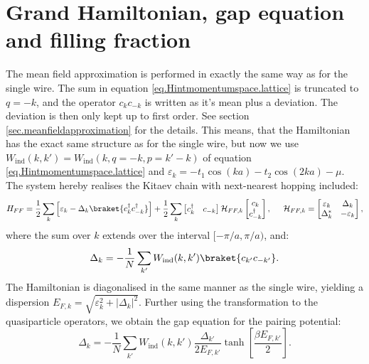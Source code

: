 \section{Grand Hamiltonian, gap equation and filling fraction} \label{sec.grandhamiltonian.lattice}
The mean field approximation is performed in exactly the same way as for the single wire. The sum in equation \eqref{eq.Hintmomentumspace.lattice} is truncated to $q = -k$, and the operator $c_kc_{-k}$ is written as it's mean plus a deviation. The deviation is then only kept up to first order. See section \ref{sec.meanfieldapproximation} for the details. This means, that the Hamiltonian has the exact same structure as for the single wire, but now we use $W_{\text{ind}}(k, k') = W_{\text{ind}}(k, q = -k, p = k' - k)$ of equation \eqref{eq.Hintmomentumspace.lattice} and $\varepsilon_k = - t_1\cos(ka) - t_2\cos(2ka) - \mu$. The system hereby realises the Kitaev chain with next-nearest hopping included: 
\begin{equation}
H_{FF} = \frac{1}{2}\sum_k \left[\varepsilon_k - \Delta_k \braket {c^\dagger_k c^\dagger_{-k}}\right] + \frac{1}{2}\sum_{k} \begin{bmatrix} c_k^\dagger & c_{-k} \end{bmatrix} \mathcal{H}_{FF,k} \begin{bmatrix} c_k \\ c^\dagger_{-k} \end{bmatrix}, \hspace{0.5cm} \mathcal{H}_{FF,k} = \begin{bmatrix} \varepsilon_k & \Delta_k \\ \Delta^*_k & -\varepsilon_k \end{bmatrix}, 
\label{eq.grandhamiltonian.lattice}
\end{equation}
where the sum over $k$ extends over the interval $[-\pi/a, \pi/a )$, and: 
\begin{equation}
\Delta_k = - \frac{1}{N}\sum_{k'} W_{\text{ind}}(k,k')\braket{c_{k'}c_{-k'}}.
\label{eq.pairingpotential.lattice}
\end{equation}
The Hamiltonian is diagonalised in the same manner as the single wire, yielding a dispersion $E_{F,k} = \sqrt{\varepsilon^2_k + |\Delta_k|^2}$. Further using the transformation to the quasiparticle operators, we obtain the gap equation for the pairing potential: 
\begin{equation}
\Delta_k = - \frac{1}{N}\sum_{k'} W_{\text{ind}}(k,k')\frac{\Delta_{k'}}{2E_{F,k'}}\tanh\left[\frac{\beta E_{F,k'}}{2}\right].
\label{eq.gapequation.lattice}
\end{equation}
